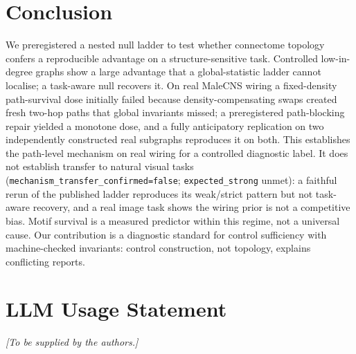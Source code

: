 \documentclass[10pt,twocolumn,letterpaper]{article}
\begin{document}
\section{Conclusion}
\label{sec:conclusion}

We preregistered a nested null ladder to test whether connectome topology
confers a reproducible advantage on a structure-sensitive task. Controlled
low-in-degree graphs show a large advantage that a global-statistic ladder
cannot localise; a task-aware null recovers it. On real MaleCNS wiring a
fixed-density path-survival dose initially failed because
density-compensating swaps created fresh two-hop paths that global invariants
missed; a preregistered path-blocking repair yielded a monotone dose, and a
fully anticipatory replication on two independently constructed real subgraphs
reproduces it on both. This establishes the path-level mechanism on real
wiring for a controlled diagnostic label. It does not establish transfer to
natural visual tasks (\texttt{mechanism\_transfer\_confirmed=false};
\texttt{expected\_strong} unmet): a faithful rerun of the published ladder
reproduces its weak/strict pattern but not task-aware recovery, and a real
image task shows the wiring prior is not a competitive bias. Motif survival is
a measured predictor within this regime, not a universal cause. Our contribution is a
diagnostic standard for control sufficiency with machine-checked invariants:
control construction, not topology, explains conflicting reports.

\clearpage

\section*{LLM Usage Statement}
\emph{[To be supplied by the authors.]}

{
\small


}
\end{document}
